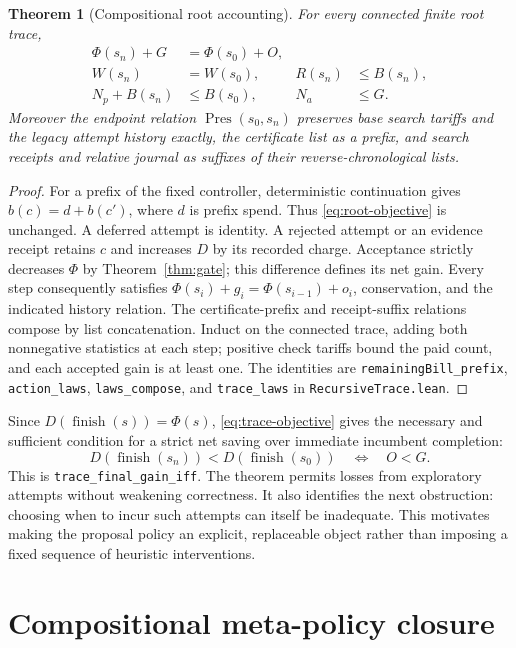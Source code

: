 \documentclass[10pt,letterpaper]{article}
\newtheorem{theorem}{Theorem}[section]
\newcommand{\Pres}{\operatorname{Pres}}
\newcommand{\finish}{\operatorname{finish}}
\newcommand{\rc}[1]{\texttt{#1}}
\begin{document}
\begin{theorem}[Compositional root accounting]\label{thm:root-trace}
For every connected finite root trace,
\begin{align}
 \Phi(s_n)+G&=\Phi(s_0)+O,\label{eq:trace-objective}\\
 W(s_n)&=W(s_0),& R(s_n)&\le B(s_n),\label{eq:trace-funds}\\
 N_p+B(s_n)&\le B(s_0),& N_a&\le G.
\end{align}
Moreover the endpoint relation $\Pres(s_0,s_n)$ preserves base search tariffs and the legacy attempt history exactly, the certificate list as a prefix, and search receipts and relative journal as suffixes of their reverse-chronological lists.
\end{theorem}
\begin{proof}
For a prefix of the fixed controller, deterministic continuation gives $b(c)=d+b(c')$, where $d$ is prefix spend. Thus \eqref{eq:root-objective} is unchanged. A deferred attempt is identity. A rejected attempt or an evidence receipt retains $c$ and increases $D$ by its recorded charge. Acceptance strictly decreases $\Phi$ by Theorem~\ref{thm:gate}; this difference defines its net gain. Every step consequently satisfies $\Phi(s_i)+g_i=\Phi(s_{i-1})+o_i$, conservation, and the indicated history relation. The certificate-prefix and receipt-suffix relations compose by list concatenation. Induct on the connected trace, adding both nonnegative statistics at each step; positive check tariffs bound the paid count, and each accepted gain is at least one. The identities are \rc{remainingBill\_prefix}, \rc{action\_laws}, \rc{laws\_compose}, and \rc{trace\_laws} in \rc{RecursiveTrace.lean}.
\end{proof}
Since $D(\finish(s))=\Phi(s)$, \eqref{eq:trace-objective} gives the necessary and sufficient condition for a strict net saving over immediate incumbent completion:
\begin{equation}\label{eq:net-gain}
 D(\finish(s_n))<D(\finish(s_0))\quad\Longleftrightarrow\quad O<G.
\end{equation}
This is \rc{trace\_final\_gain\_iff}. The theorem permits losses from exploratory attempts without weakening correctness. It also identifies the next obstruction: choosing when to incur such attempts can itself be inadequate. This motivates making the proposal policy an explicit, replaceable object rather than imposing a fixed sequence of heuristic interventions.
\section{Compositional meta-policy closure}\label{sec:closure}
\end{document}
